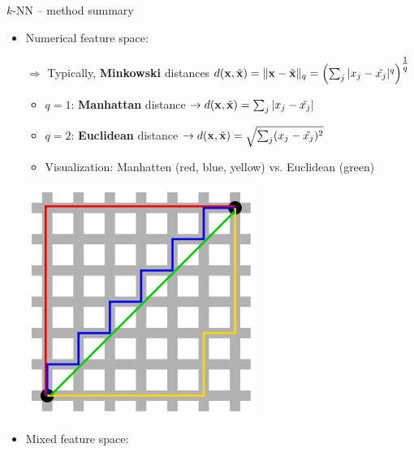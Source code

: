 
\begin{frame}{$k$-NN -- method summary}


\begin{itemize}
  \item Numerical feature space:\\
  \begin{minipage}{0.7\textwidth}
  $\Rightarrow$ Typically, \textbf{Minkowski} distances
  $d(\mathbf{x}, \tilde{\mathbf{x}}) = \|\mathbf{x} - \tilde{\mathbf{x}} \|_q = 
  \left( \sum_j | x_j - \tilde{x_j} |^q
  \right)^{\tfrac{1}{q}}$
  \begin{itemize}
    \item $q = 1$: \textbf{Manhattan} distance $\rightarrow d(\mathbf{x}, \tilde{\mathbf{x}}) =
    \sum_j | x_j - \tilde{x_j} |$
  \item $q = 2$: \textbf{Euclidean} distance $\rightarrow d(\mathbf{x}, \tilde{\mathbf{x}}) =
  \sqrt{\sum_j (x_j - \tilde{x_j})^2}$
  \item Visualization: Manhatten (red, blue, yellow) vs. Euclidean (green)
  \end{itemize}
\end{minipage}%
\begin{minipage}{0.25\textwidth}
 \begin{center}
  \includegraphics[width=.6\textwidth]{learners-overview/figure/manhattan_distance.png} %
 \end{center}
\end{minipage}
    \medskip
  \item Mixed feature space: 

\end{itemize}
\end{frame}
